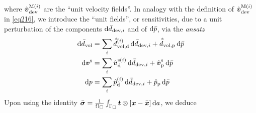 \documentclass[10pt,a4paper]{article}
\newcommand{\ded}{\mathrm{d}}
\newcommand{\dep}{\mathrm{p}}
\begin{document}
where $\hat{\boldsymbol{v}}^{\mathrm{M}(i)}_{\mathrm{dev}}$ are the ``unit velocity fields''. 
In analogy with the definition of $\hat{\boldsymbol{v}}^{\mathrm{M}(i)}_{\mathrm{dev}}$
in \eqref{eq216}, we introduce the ``unit fields'', or sensitivities, due to a unit perturbation of the components $\operatorname{d \!}\bar{d}_{\mathrm{dev},i}$ and of $\operatorname{d \!}\bar{p}$, via the \emph{ansatz}
\begin{align}
    \dif\bar{d}_\vol &= \sum_i \hat{\bar{d}}_{\vol,\ded}^{(i)}\dif\bar{d}_{\dev,i} + \hat{\bar{d}}_{\vol,\dep} \dif \bar{p}
\\
    \dif\ta v^\fluct &= \sum_i \hat{\ta{v}}_{\ded}^{\fluct(i)}\dif\bar{d}_{\dev,i} + \hat{\ta v}_{\dep}^\fluct \dif \bar{p}
\\
    \dif p           &= \sum_i \hat{p}_{\ded}^{(i)}\dif\bar{d}_{\dev,i} + \hat{p}_{\dep} \dif \bar{p}
\end{align}
Upon using the identity $\bar{\boldsymbol{\sigma}}=\frac{1}{\Omega_\Box} \int_{\Gamma_\Box} \boldsymbol{t} \mathbin{\otimes} [\boldsymbol{x} - \bar{\boldsymbol{x}}]\operatorname{d \!} a$, we deduce
\end{document}
